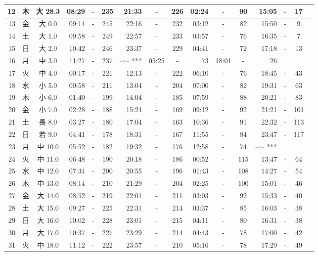 \documentclass[12pt.a4j]{jsarticle}
\begin{document}
\begin{center}
\begin{table}[ht]
\begin{tabular}{|rc|cr|ccrccr|ccrccr|}
\hline
12 & 木 & 大 28.3 & 08:29 &-& 235 & 21:33 &-& 226 & 02:24 &-&  90 & 15:05 &-&  17 \\
\hline
13 & 金 & 大  0.0 & 09:14 &-& 245 & 22:16 &-& 232 & 03:12 &-&  82 & 15:50 &-&   9 \\
\hline
14 & 土 & 大  1.0 & 09:58 &-& 249 & 22:57 &-& 233 & 03:57 &-&  76 & 16:35 &-&   7 \\
\hline
15 & 日 & 大  2.0 & 10:42 &-& 246 & 23:37 &-& 229 & 04:41 &-&  72 & 17:18 &-&  13 \\
\hline
16 & 月 & 中  3.0 & 11:27 &-& 237 & --:--   *** & 05:25 &-&  73 & 18:01 &-&  26 \\
\hline
17 & 火 & 中  4.0 & 00:17 &-& 221 & 12:13 &-& 222 & 06:10 &-&  76 & 18:45 &-&  43 \\
\hline
18 & 水 & 小  5.0 & 00:58 &-& 211 & 13:04 &-& 204 & 07:00 &-&  82 & 19:31 &-&  63 \\
\hline
19 & 木 & 小  6.0 & 01:40 &-& 199 & 14:04 &-& 185 & 07:59 &-&  88 & 20:21 &-&  83 \\
\hline
20 & 金 & 小  7.0 & 02:28 &-& 188 & 15:24 &-& 169 & 09:12 &-&  92 & 21:21 &-& 101 \\
\hline
21 & 土 & 長  8.0 & 03:27 &-& 180 & 17:04 &-& 163 & 10:36 &-&  91 & 22:32 &-& 113 \\
\hline
22 & 日 & 若  9.0 & 04:41 &-& 178 & 18:31 &-& 167 & 11:55 &-&  84 & 23:47 &-& 117 \\
\hline
23 & 月 & 中 10.0 & 05:52 &-& 182 & 19:32 &-& 176 & 12:58 &-&  74 & --:--   *** \\
\hline
24 & 火 & 中 11.0 & 06:48 &-& 190 & 20:18 &-& 186 & 00:52 &-& 115 & 13:47 &-&  64 \\
\hline
25 & 水 & 中 12.0 & 07:34 &-& 200 & 20:55 &-& 196 & 01:43 &-& 108 & 14:27 &-&  54 \\
\hline
26 & 木 & 中 13.0 & 08:14 &-& 210 & 21:29 &-& 204 & 02:25 &-& 100 & 15:01 &-&  46 \\
\hline
27 & 金 & 大 14.0 & 08:52 &-& 219 & 22:01 &-& 211 & 03:03 &-&  92 & 15:33 &-&  40 \\
\hline
28 & 土 & 大 15.0 & 09:27 &-& 225 & 22:31 &-& 214 & 03:37 &-&  85 & 16:03 &-&  38 \\
\hline
29 & 日 & 大 16.0 & 10:02 &-& 228 & 23:01 &-& 215 & 04:11 &-&  80 & 16:31 &-&  38 \\
\hline
30 & 月 & 大 17.0 & 10:37 &-& 227 & 23:29 &-& 214 & 04:43 &-&  78 & 17:00 &-&  42 \\
\hline
31 & 火 & 中 18.0 & 11:12 &-& 222 & 23:57 &-& 210 & 05:16 &-&  78 & 17:29 &-&  49 \\

\end{tabular}
\end{table}
\end{center}
\end{document}
